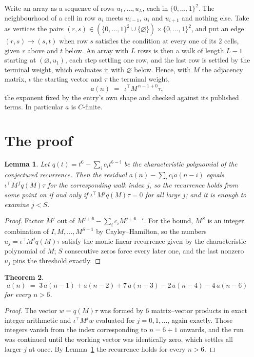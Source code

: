\documentclass[11pt,a4paper]{article}
\theoremstyle{plain}
\newtheorem{theorem}{Theorem}
\newtheorem{lemma}[theorem]{Lemma}
\theoremstyle{definition}
\begin{document}
Write an array as a sequence of rows $u_1,\dots,u_L$, each in
$\{0,\dots,1\}^{2}$. The neighbourhood of a cell in row $u_i$ meets $u_{i-1}$,
$u_i$ and $u_{i+1}$ and nothing else. Take as vertices the pairs
$(r,s)\in(\{0,\dots,1\}^{2}\cup\{\varnothing\})\times\{0,\dots,1\}^{2}$,
and put an edge $(r,s)\to(s,t)$ when row $s$ satisfies the condition at every one of its
$2$ cells, given $r$ above and $t$ below. An array with $L$ rows is then a walk of length
$L-1$ starting at $(\varnothing,u_1)$, each step settling one row, and the last row is
settled by the terminal weight, which evaluates it with $\varnothing$ below. Hence,
with $M$ the adjacency matrix, $\iota$ the starting vector and $\tau$ the terminal weight,
\[
a(n)\;=\;\,\iota^{\!\top}M^{\,n-1+0}\tau ,
\]
the exponent fixed by the entry's own shape and checked against its published terms. In
particular $a$ is $C$-finite.

\section{The proof}

\begin{lemma}\label{lem:crit}
Let $q(t)=t^{6}-\sum_i c_it^{6-i}$ be the characteristic polynomial of the
conjectured recurrence. Then the residual $a(n)-\sum_ic_ia(n-i)$ equals
$\iota^{\!\top}M^{\,j}q(M)\tau$ for the corresponding walk index $j$, so the
recurrence holds from some point on if and only if $\iota^{\!\top}M^{j}q(M)\tau=0$ for all
large $j$; and it is enough to examine $j<S$.
\end{lemma}

\begin{proof}
Factor $M^{j}$ out of $M^{j+6}-\sum_ic_iM^{j+6-i}$. For the bound, $M^{S}$
is an integer combination of $I,M,\dots,M^{S-1}$ by Cayley--Hamilton, so the numbers
$u_j=\iota^{\!\top}M^{j}q(M)\tau$ satisfy the monic linear recurrence given by the
characteristic polynomial of $M$; $S$ consecutive zeros force every later one, and the last
nonzero $u_j$ pins the threshold exactly.
\end{proof}

\begin{theorem}
\[
a(n)\;=\;3\,a(n-1) + a(n-2) + 7\,a(n-3) - 2\,a(n-4) - 4\,a(n-6)
\]
for every $n>6$.
\end{theorem}

\begin{proof}
The vector $w=q(M)\tau$ was formed by $6$ matrix--vector products in exact integer
arithmetic and $\iota^{\!\top}M^{j}w$ evaluated for $j=0,1,\dots$, again exactly. Those
integers vanish from the index corresponding to $n=6+1$ onwards, and the run was
continued until the working vector was identically zero, which settles all larger $j$ at once.
By Lemma~\ref{lem:crit} the recurrence holds for every $n>6$.
\end{proof}
\end{document}
